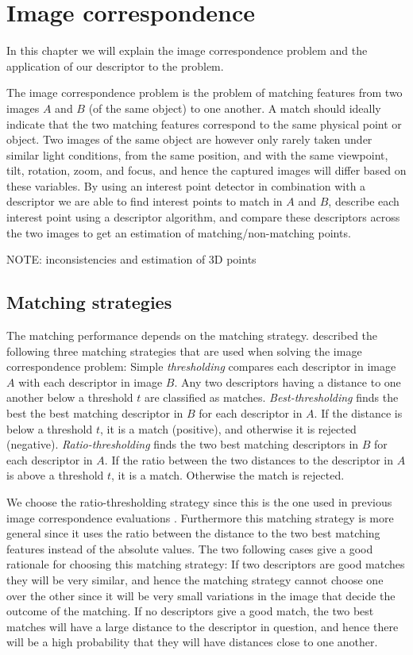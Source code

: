 \documentclass[thesis.tex]{subfiles}
\begin{document}
\chapter{Image correspondence}

In this chapter we will explain the image correspondence problem and the application of our descriptor to the problem.

The image correspondence problem is the problem of matching features from two images $A$ and $B$ (of the same object) to one another. A match should ideally indicate that the two matching features correspond to the same physical point or object. Two images of the same object are however only rarely taken under similar light conditions, from the same position, and with the same viewpoint, tilt, rotation, zoom, and focus, and hence the captured images will differ based on these variables. By using an interest point detector in combination with a descriptor we are able to find interest points to match in $A$ and $B$, describe each interest point using a descriptor algorithm, and compare these descriptors across the two images to get an estimation of matching/non-matching points.

NOTE: inconsistencies and estimation of 3D points

\section{Matching strategies}
\label{sec:matching_strategies}

The matching performance depends on the matching strategy. \citet{mikolajczyk2005performance} described the following three matching strategies that are used when solving the image correspondence problem:
Simple \emph{thresholding} compares each descriptor in image $A$ with each descriptor in image $B$. Any two descriptors having a distance to one another below a threshold $t$ are classified as matches. \emph{Best-thresholding} finds the best the best matching descriptor in $B$ for each descriptor in $A$. If the distance is below a threshold $t$, it is a match (positive), and otherwise it is rejected (negative). \emph{Ratio-thresholding} finds the two best matching descriptors in $B$ for each descriptor in $A$. If the ratio between the two distances to the descriptor in $A$ is above a threshold $t$, it is a match. Otherwise the match is rejected.

We choose the ratio-thresholding strategy since this is the one used in previous image correspondence evaluations \cite{mikolajczyk2005performance,dahl2011finding,larsen2012jet}. Furthermore this matching strategy is more general since it uses the ratio between the distance to the two best matching features instead of the absolute values. The two following cases give a good rationale for choosing this matching strategy: If two descriptors are good matches they will be very similar, and hence the matching strategy cannot choose one over the other since it will be very small variations in the image that decide the outcome of the matching. If no descriptors give a good match, the two best matches will have a large distance to the descriptor in question, and hence there will be a high probability that they will have distances close to one another.
\end{document}
